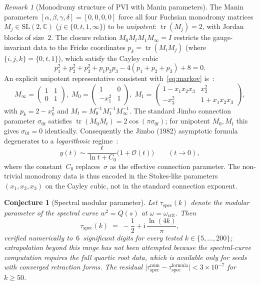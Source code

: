 \documentclass[11pt,a4paper]{article}
\theoremstyle{plain}
\newtheorem{conjecture}[theorem]{Conjecture}
\theoremstyle{definition}
\theoremstyle{remark}
\newtheorem{remark}[theorem]{Remark}
\DeclareMathOperator{\tr}{tr}
\newcommand{\CC}{\mathbb{C}}
\newcommand{\ii}{\mathrm{i}}
\newcommand{\Oo}{\mathcal{O}}
\begin{document}
\begin{remark}[Monodromy structure of PVI with Manin parameters]
\label{rem:unipotent}
The Manin parameters $[\alpha,\beta,\gamma,\delta] = [0,0,0,0]$
force all four Fuchsian monodromy matrices $M_j \in \mathrm{SL}(2,\CC)$
($j \in \{0,t,1,\infty\}$) to be \emph{unipotent}:
$\tr(M_j) = 2$, with Jordan blocks of size~$2$.
The closure relation $M_0 M_t M_1 M_\infty = I$ restricts
the gauge-invariant data to the Fricke coordinates
$p_k = \tr(M_i M_j)$ (where $\{i,j,k\} = \{0,t,1\}$),
which satisfy the Cayley cubic
\begin{equation}\label{eq:markov}
  p_1^2 + p_2^2 + p_3^2 + p_1 p_2 p_3
  - 4(p_1 + p_2 + p_3) + 8 = 0.
\end{equation}
An explicit unipotent representative consistent with~\eqref{eq:markov}
is~\cite{Jim82}:
\[
  M_\infty = \begin{pmatrix} 1 & 1 \\ 0 & 1 \end{pmatrix},\;
  M_0 = \begin{pmatrix} 1 & 0 \\ -x_1^2 & 1 \end{pmatrix},\;
  M_1 = \begin{pmatrix} 1-x_1 x_2 x_3 & x_2^2 \\
    -x_3^2 & 1+x_1 x_2 x_3 \end{pmatrix},
\]
with $p_k = 2 - x_k^2$ and $M_t = M_0^{-1}M_1^{-1}M_\infty^{-1}$.
%
The standard Jimbo connection parameter
$\sigma_{0t}$ satisfies $\tr(M_0 M_t) = 2\cos(\pi\sigma_{0t})$;
for unipotent $M_0, M_t$ this gives $\sigma_{0t} = 0$ identically.
Consequently the Jimbo (1982) asymptotic formula degenerates to
a \emph{logarithmic} regime~\cite{Jim82}:
\begin{equation}\label{eq:jimbo-log}
  y(t) \sim \frac{t}{\ln t + C_0}\bigl(1 + \Oo(t)\bigr)
  \qquad (t \to 0),
\end{equation}
where the constant~$C_0$ replaces~$\sigma$ as the effective
connection parameter.
The non-trivial monodromy data is thus encoded in
the Stokes-like parameters $(x_1, x_2, x_3)$ on the
Cayley cubic, not in the standard connection exponent.
\end{remark}

\begin{conjecture}[Spectral modular parameter]
\label{conj:tau-spec}
Let $\tau_{\mathrm{spec}}(k)$ denote the modular parameter of the
spectral curve $w^2 = Q(s)$ at $\omega = \omega_{\mathrm{crit}}$.
Then
\begin{equation}\label{eq:tau-spec}
  \tau_{\mathrm{spec}}(k)
  \;=\; -\frac{1}{2} + \ii\,\frac{\ln(4k)}{\pi},
\end{equation}
verified numerically to~$6$~significant digits for every
tested $k \in \{5,\ldots,200\}$; extrapolation beyond this range
has not been attempted because the spectral-curve computation
requires the full quartic root data, which is available only for
seeds with converged retraction forms.  The residual
$\lvert\tau_{\mathrm{spec}}^{\mathrm{num}} - \tau_{\mathrm{spec}}^%
  {\mathrm{formula}}\rvert < 3 \times 10^{-7}$
for $k \ge 50$.
\end{conjecture}
\end{document}
